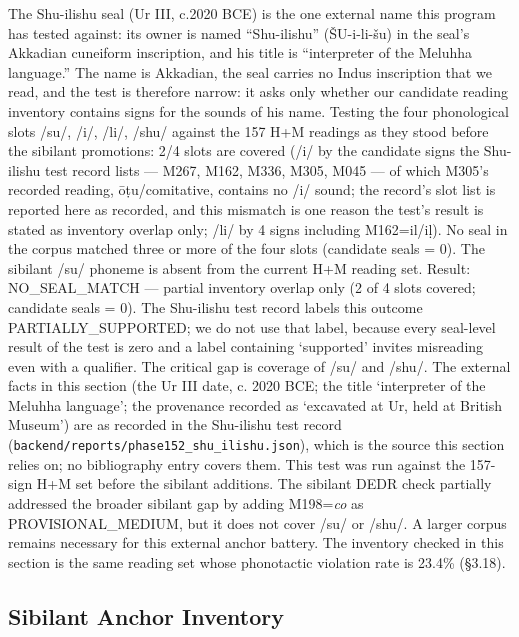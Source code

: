 \documentclass[11pt]{article}
\begin{document}
The Shu-ilishu seal (Ur III, c.2020 BCE) is the one external name this program has tested against: its owner is named ``Shu-ilishu'' (ŠU-i-li-šu) in the seal's Akkadian cuneiform inscription, and his title is ``interpreter of the Meluhha language.'' The name is Akkadian, the seal carries no Indus inscription that we read, and the test is therefore narrow: it asks only whether our candidate reading inventory contains signs for the sounds of his name. Testing the four phonological slots /su/, /i/, /li/, /shu/ against the 157 H+M readings as they stood before the sibilant promotions: 2/4 slots are covered (/i/ by the candidate signs the Shu-ilishu test record lists --- M267, M162, M336, M305, M045 --- of which M305's recorded reading, ōṭu/comitative, contains no /i/ sound; the record's slot list is reported here as recorded, and this mismatch is one reason the test's result is stated as inventory overlap only; /li/ by 4 signs including M162=il/iḷ). No seal in the corpus matched three or more of the four slots (candidate seals = 0). The sibilant /su/ phoneme is absent from the current H+M reading set. Result: NO\_SEAL\_MATCH --- partial inventory overlap only (2 of 4 slots covered; candidate seals = 0). The Shu-ilishu test record labels this outcome PARTIALLY\_SUPPORTED; we do not use that label, because every seal-level result of the test is zero and a label containing `supported' invites misreading even with a qualifier. The critical gap is coverage of /su/ and /shu/. The external facts in this section (the Ur III date, c. 2020 BCE; the title `interpreter of the Meluhha language'; the provenance recorded as `excavated at Ur, held at British Museum') are as recorded in the Shu-ilishu test record (\texttt{backend/reports/phase152\_shu\_ilishu.json}), which is the source this section relies on; no bibliography entry covers them. This test was run against the 157-sign H+M set before the sibilant additions. The sibilant DEDR check partially addressed the broader sibilant gap by adding M198=\emph{co} as PROVISIONAL\_MEDIUM, but it does not cover /su/ or /shu/. A larger corpus remains necessary for this external anchor battery. The inventory checked in this section is the same reading set whose phonotactic violation rate is 23.4\% (§3.18).

\subsection{Sibilant Anchor Inventory
}\label{sibilant-anchor-inventory-phase-153}
\end{document}
